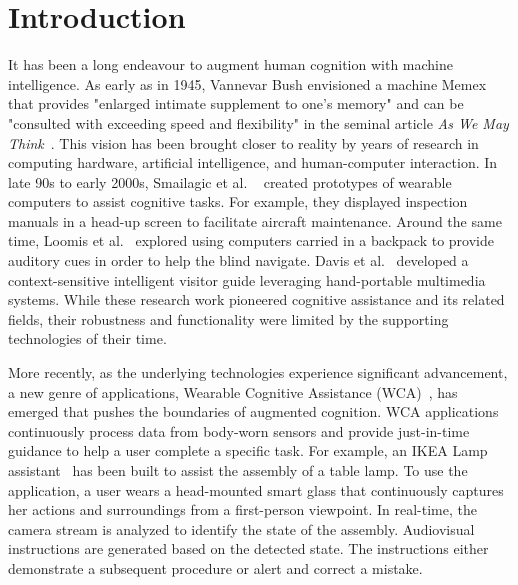 \chapter{Introduction}
\label{chapter: intro}

It has been a long endeavour to augment human cognition with machine
intelligence. As early as in 1945, Vannevar Bush envisioned a machine Memex that
provides "enlarged intimate supplement to one's memory" and can be "consulted
with exceeding speed and flexibility" in the seminal article \textit{As We May
Think}~\cite{bush1945we}. This vision has been brought closer to reality by
years of research in computing hardware, artificial intelligence, and
human-computer interaction. In late 90s to early 2000s, Smailagic et al.
~\cite{smailagic1993case,smailagic1998very,smailagic2002application} created
prototypes of wearable computers to assist cognitive tasks. For example, they
displayed inspection manuals in a head-up screen to facilitate aircraft
maintenance. Around the same time, Loomis et
al.~\cite{loomis1998navigation,loomis1994personal} explored using computers
carried in a backpack to provide auditory cues in order to help the blind
navigate.  Davis et al.~\cite{davies1998developing,cheverst2000developing}
developed a context-sensitive intelligent visitor guide leveraging hand-portable
multimedia systems. While these research work pioneered cognitive assistance and
its related fields, their robustness and functionality were limited by the
supporting technologies of their time.

More recently, as the underlying technologies experience significant
advancement, a new genre of applications, Wearable Cognitive Assistance
(WCA)~\cite{ha2014towards,chen2018application}, has emerged that pushes
the boundaries of augmented cognition. WCA applications continuously process
data from body-worn sensors and provide just-in-time guidance to help a user
complete a specific task. For example, an IKEA Lamp
assistant~\cite{chen2018application} has been built to assist the assembly of a
table lamp. To use the application, a user wears a head-mounted smart glass that
continuously captures her actions and surroundings from a first-person
viewpoint. In real-time, the camera stream is analyzed to identify the state of
the assembly. Audiovisual instructions are generated based on the detected
state. The instructions either demonstrate a subsequent procedure or alert and
correct a mistake.

